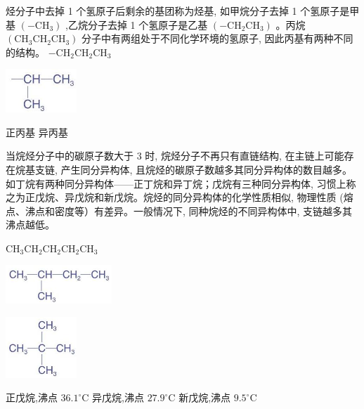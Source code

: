 \documentclass[10pt]{article}
\begin{document}
烃分子中去掉 1 个氢原子后剩余的基团称为烃基, 如甲烷分子去掉 1 个氢原子是甲基 \(\left( {-{\mathrm{{CH}}}_{3}}\right)\) ,乙烷分子去掉 1 个氢原子是乙基 \(\left( {-{\mathrm{{CH}}}_{2}{\mathrm{{CH}}}_{3}}\right)\) 。丙烷 \(\left( {{\mathrm{{CH}}}_{3}{\mathrm{{CH}}}_{2}{\mathrm{{CH}}}_{3}}\right)\) 分子中有两组处于不同化学环境的氢原子, 因此丙基有两种不同的结构。 \(- {\mathrm{{CH}}}_{2}{\mathrm{{CH}}}_{2}{\mathrm{{CH}}}_{3}\)

\begin{center}
\includegraphics[max width=0.2\textwidth]{images/0190efc5-b58a-7c43-bfb0-e0a030df9cfd_35_268921.jpg}
\end{center}

正丙基 异丙基

当烷烃分子中的碳原子数大于 3 时, 烷烃分子不再只有直链结构, 在主链上可能存在烷基支链, 产生同分异构体, 且烷烃的碳原子数越多其同分异构体的数目越多。如丁烷有两种同分异构体——正丁烷和异丁烷；戊烷有三种同分异构体, 习惯上称之为正戊烷、异戊烷和新戊烷。烷烃的同分异构体的化学性质相似, 物理性质 (熔点、沸点和密度等）有差异。一般情况下, 同种烷烃的不同异构体中, 支链越多其沸点越低。

\({\mathrm{{CH}}}_{3}{\mathrm{{CH}}}_{2}{\mathrm{{CH}}}_{2}{\mathrm{{CH}}}_{2}{\mathrm{{CH}}}_{3}\)

\begin{center}
\includegraphics[max width=0.3\textwidth]{images/0190efc5-b58a-7c43-bfb0-e0a030df9cfd_36_782567.jpg}
\end{center}

\begin{center}
\includegraphics[max width=0.2\textwidth]{images/0190efc5-b58a-7c43-bfb0-e0a030df9cfd_36_595162.jpg}
\end{center}

正戊烷,沸点 \({36.1}^{ \circ }\mathrm{C}\) 异戊烷,沸点 \({27.9}^{ \circ }\mathrm{C}\) 新戊烷,沸点 \({9.5}^{ \circ }\mathrm{C}\)
\end{document}
